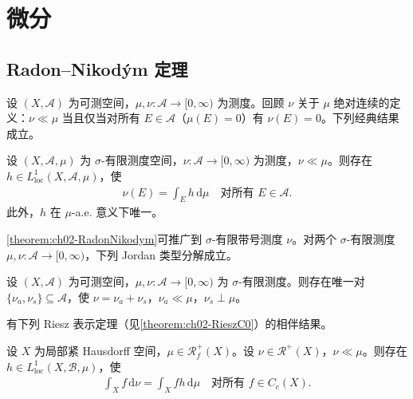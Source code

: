 \documentclass[../../main.tex]{subfiles}%
\begin{document}
\section{微分}\label{section:ch02-微分}

\subsection{Radon--Nikod\'ym 定理}\label{subsection:ch02-RadonNikodym}

设 $(X,\mathscr A)$ 为可测空间，$\mu,\nu:\mathscr A\to[0,\infty)$ 为测度。回顾 $\nu$ 关于 $\mu$ 绝对连续的定义：$\nu\ll\mu$ 当且仅当对所有 $E\in\mathscr A$（$\mu(E)=0$）有 $\nu(E)=0$。下列经典结果成立。

\begin{theorem}\label{theorem:ch02-RadonNikodym}
设 $(X,\mathscr A,\mu)$ 为 $\sigma$-有限测度空间，$\nu:\mathscr A\to[0,\infty)$ 为测度，$\nu\ll\mu$。则存在 $h\in L^1_{\mathrm{loc}}(X,\mathscr A,\mu)$，使
\begin{align}
\nu(E)=\int_E h\,\mathrm{d}\mu\quad\text{对所有 }E\in\mathscr A. \label{align:ch02-2.75}
\end{align}
此外，$h$ 在 $\mu$-a.e. 意义下唯一。
\end{theorem}

\cref{theorem:ch02-RadonNikodym}可推广到 $\sigma$-有限带号测度 $\nu$。对两个 $\sigma$-有限测度 $\mu,\nu:\mathscr A\to[0,\infty)$，下列 Jordan 类型分解成立。

\begin{theorem}[Lebesgue 分解]\label{theorem:ch02-Lebesgue分解}
设 $(X,\mathscr A)$ 为可测空间，$\mu,\nu:\mathscr A\to[0,\infty)$ 为 $\sigma$-有限测度。则存在唯一对 $\{\nu_a,\nu_s\}\subseteq\mathscr A$，使 $\nu=\nu_a+\nu_s$，$\nu_a\ll\mu$，$\nu_s\perp\mu$。
\end{theorem}

有下列 Riesz 表示定理（见\cref{theorem:ch02-RieszC0}）的相伴结果。

\begin{proposition}\label{proposition:ch02-绝对连续泛函}
\label{remark:ch02-绝对连续}
设 $X$ 为局部紧 Hausdorff 空间，$\mu\in\mathscr R^+_f(X)$。设 $\nu\in\mathscr R^+(X)$，$\nu\ll\mu$。则存在 $h\in L^1_{\mathrm{loc}}(X,\mathscr B,\mu)$，使
\begin{align}
\int_X f\,\mathrm{d}\nu=\int_X fh\,\mathrm{d}\mu\quad\text{对所有 }f\in C_c(X). \label{align:ch02-2.76}
\end{align}
\end{proposition}
\end{document}
